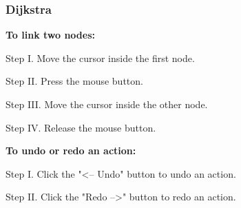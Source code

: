 \subsubsection{Dijkstra}

\textbf{To link two nodes:}
\begin{userManualItemlist}
    \item[Step I.] Move the cursor inside the first node.
    \item[Step II.] Press the mouse button.
    \item[Step III.] Move the cursor inside the other node.
    \item[Step IV.] Release the mouse button.    
\end{userManualItemlist}

\textbf{To undo or redo an action:}
\begin{userManualItemlist}
    \item[Step I.] Click the "<-- Undo" button to undo an action.
    \item[Step II.] Click the "Redo -->" button to redo an action. 
\end{userManualItemlist}